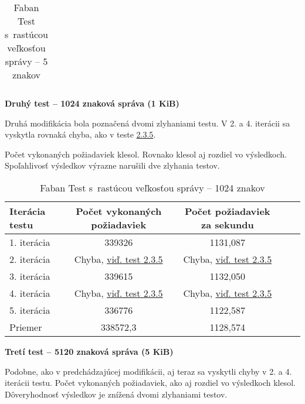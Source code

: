 \documentclass[12pt,oneside,final]{fithesis-utf8}
\begin{document}
\begin{itemize}
\begin{table}[H]
\begin{center}
\begin{tabular}{ | l | c | c | c | c |}
\end{tabular}
\end{center}
\caption{Faban Test s~rastúcou veľkosťou správy -- 5 znakov}
\end{table}


\textbf{Druhý test -- 1024 znaková správa (1 KiB)}

Druhá modifikácia bola poznačená dvomi zlyhaniami testu. V 2. a 4. iterácii sa vyskytla rovnaká chyba, ako v teste \hyperlink{label}{2.3.5}.
\par Počet vykonaných požiadaviek klesol. Rovnako klesol aj rozdiel vo výsledkoch. Spoľahlivosť výsledkov výrazne narušili dve zlyhania testov.

\begin{table}[H]
\begin{center}
\begin{tabular}{ | l | c | c | c | c |}
		\hline
		 \textbf{Iterácia testu} & \textbf{Počet vykonaných požiadaviek} & \textbf{Počet požiadaviek za sekundu} \\ \hline
		 1. iterácia & 339326 & 1131,087 \\ \hline
		 2. iterácia & Chyba, \hyperlink{label}{viď. test 2.3.5} & Chyba, \hyperlink{label}{viď. test 2.3.5} \\ \hline
		 3. iterácia & 339615 & 1132,050 \\ \hline
		 4. iterácia & Chyba, \hyperlink{label}{viď. test 2.3.5} & Chyba, \hyperlink{label}{viď. test 2.3.5} \\ \hline
		 5. iterácia & 336776 & 1122,587 \\ \hline
		 Priemer & 338572,3 & 1128,574 \\ \hline
		 
\end{tabular}
\end{center}
\caption{Faban Test s~rastúcou veľkosťou správy -- 1024 znakov}
\end{table}


\textbf{Tretí test -- 5120 znaková správa (5 KiB)}

Podobne, ako v predchádzajúcej modifikácii, aj teraz sa vyskytli chyby v 2. a 4. iterácii testu. Počet vykonaných požiadaviek, ako aj rozdiel vo výsledkoch klesol. Dôveryhodnosť výsledkov je znížená dvomi zlyhaniami testov.


\end{itemize}
\end{document}
